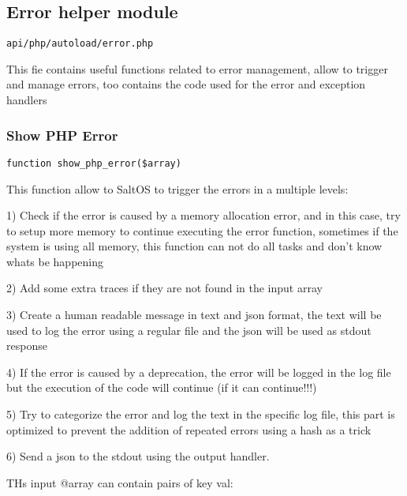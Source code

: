 \documentclass[a4paper]{article}
\begin{document}
\hypertarget{toc110}{}
\subsection{Error helper module}

\begin{lstlisting}
api/php/autoload/error.php
\end{lstlisting}

This fie contains useful functions related to error management, allow to trigger and manage
errors, too contains the code used for the error and exception handlers

\hypertarget{toc111}{}
\subsubsection{Show PHP Error}

\begin{lstlisting}
function show_php_error($array)
\end{lstlisting}

This function allow to SaltOS to trigger the errors in a multiple levels:

1) Check if the error is caused by a memory allocation error, and in this case, try
to setup more memory to continue executing the error function, sometimes if the system
is using all memory, this function can not do all tasks and don't know whats be happening

2) Add some extra traces if they are not found in the input array

3) Create a human readable message in text and json format, the text will be used
to log the error using a regular file and the json will be used as stdout response

4) If the error is caused by a deprecation, the error will be logged in the log file
but the execution of the code will continue (if it can continue!!!)

5) Try to categorize the error and log the text in the specific log file, this part
is optimized to prevent the addition of repeated errors using a hash as a trick

6) Send a json to the stdout using the output handler.

THs input @array can contain pairs of key val:
\end{document}
